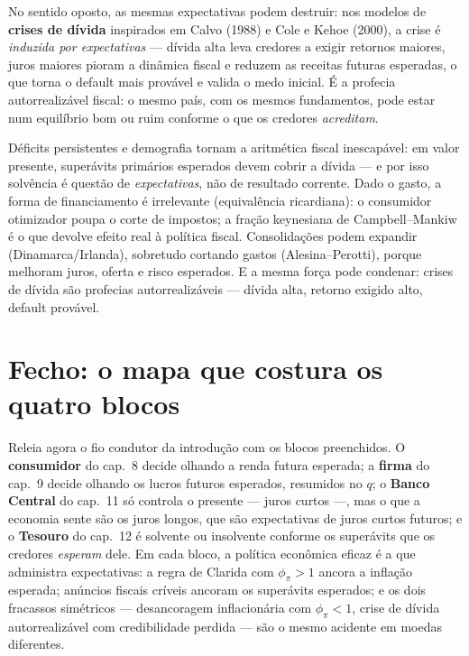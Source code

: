 \documentclass[12pt, a4paper]{article}
\begin{document}
No sentido oposto, as mesmas expectativas podem destruir: nos modelos de
\textbf{crises de dívida} inspirados em Calvo (1988) e Cole e Kehoe (2000), a
crise é \emph{induzida por expectativas} --- dívida alta leva credores a
exigir retornos maiores, juros maiores pioram a dinâmica fiscal e reduzem as
receitas futuras esperadas, o que torna o default mais provável e valida o
medo inicial. É a profecia autorrealizável fiscal: o mesmo país, com os mesmos
fundamentos, pode estar num equilíbrio bom ou ruim conforme o que os credores
\emph{acreditam}.

\begin{sintesebox}[title={Síntese do Bloco IV --- a história em quatro frases}]
Déficits persistentes e demografia tornam a aritmética fiscal inescapável: em
valor presente, superávits primários esperados devem cobrir a dívida --- e por
isso solvência é questão de \emph{expectativas}, não de resultado corrente.
Dado o gasto, a forma de financiamento é irrelevante (equivalência
ricardiana): o consumidor otimizador poupa o corte de impostos; a fração
keynesiana de Campbell--Mankiw é o que devolve efeito real à política fiscal.
Consolidações podem expandir (Dinamarca/Irlanda), sobretudo cortando gastos
(Alesina--Perotti), porque melhoram juros, oferta e risco esperados. E a
mesma força pode condenar: crises de dívida são profecias autorrealizáveis
--- dívida alta, retorno exigido alto, default provável.
\end{sintesebox}

\section{Fecho: o mapa que costura os quatro blocos}

Releia agora o fio condutor da introdução com os blocos preenchidos. O
\textbf{consumidor} do cap.\ 8 decide olhando a renda futura esperada; a
\textbf{firma} do cap.\ 9 decide olhando os lucros futuros esperados,
resumidos no $q$; o \textbf{Banco Central} do cap.\ 11 só controla o presente
--- juros curtos ---, mas o que a economia sente são os juros longos, que são
expectativas de juros curtos futuros; e o \textbf{Tesouro} do cap.\ 12 é
solvente ou insolvente conforme os superávits que os credores \emph{esperam}
dele. Em cada bloco, a política econômica eficaz é a que administra
expectativas: a regra de Clarida com $\phi_\pi>1$ ancora a inflação esperada;
anúncios fiscais críveis ancoram os superávits esperados; e os dois fracassos
simétricos --- desancoragem inflacionária com $\phi_\pi<1$, crise de dívida
autorrealizável com credibilidade perdida --- são o mesmo acidente em moedas
diferentes.
\end{document}
